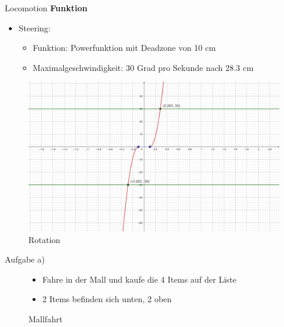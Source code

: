 \documentclass{beamer}
\begin{document}
\begin{frame}{Locomotion}
\textbf{Funktion}
\begin{itemize}
\item Steering:\begin{itemize}
\item Funktion: Powerfunktion mit Deadzone von 10 cm
\item Maximalgeschwindigkeit: 30 Grad pro Sekunde nach 28.3 cm
\end{itemize}
\end{itemize}
\begin{figure}
\centering
\includegraphics[width=.7\textwidth, keepaspectratio]{img/Rotation}
\caption{Rotation}
\end{figure}
\end{frame}


\begin{frame}{Aufgabe a)}
\begin{figure}
\begin{itemize}
\item Fahre in der Mall und kaufe die 4 Items auf der Liste
\item 2 Items befinden sich unten, 2 oben
\end{itemize}
    \centering
\caption{Mallfahrt}
\end{figure}
\end{frame}
\end{document}
